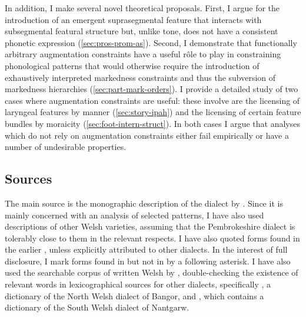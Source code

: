 In addition, I make several novel theoretical proposals. First, I argue for the introduction of an emergent suprasegmental feature that interacts with subsegmental featural structure but, unlike tone, does not have a consistent phonetic expression (\cref{sec:pros-prom-as}). Second, I demonstrate that functionally arbitrary augmentation constraints have a useful rôle to play in constraining phonological patterns that would otherwise require the introduction of exhaustively interpreted markedness constraints and thus the subversion of markedness hierarchies (\cref{sec:part-mark-orders}). I provide a detailed study of two cases where augmentation constraints are useful: these involve are the licensing of laryngeal features by manner (\cref{sec:story-ipah}) and the licensing of certain feature bundles by moraicity (\cref{sec:foot-intern-struct}). In both cases I argue that analyses which do not rely on augmentation constraints either fail empirically or have a number of undesirable properties.

\subsection{Sources}
\label{sec:sources-1}

The main source is the monographic description of the dialect by \citet{awbery86:_pembr_welsh}. Since it is mainly concerned with an analysis of selected patterns, I have also used descriptions of other Welsh varieties, assuming that the Pembrokeshire dialect is tolerably close to them in the relevant respects.  I have also quoted forms found in the earlier \citet{welshphonotactics}, unless explicitly attributed to other dialects. In the interest of full disclosure, I mark forms found in \citet{welshphonotactics} but not in \citet{awbery86:_pembr_welsh} by a following asterisk. I have also used the searchable corpus of written Welsh by \citet{cronfa}, double\hyp checking the existence of relevant words in lexicographical sources for other dialects, specifically \citet{fynes-clinton}, a dictionary of the North Welsh dialect of Bangor, and \citet{thomas93:_tafod_nantg}, which contains a dictionary of the South Welsh dialect of Nantgarw.


